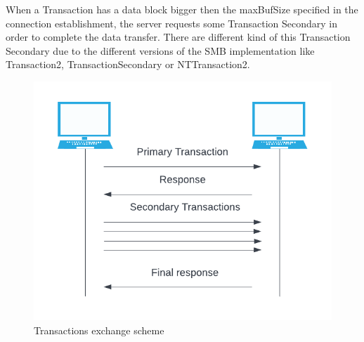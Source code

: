 When a Transaction has a data block bigger then the maxBufSize specified in the connection establishment, the server requests some Transaction Secondary in order
to complete the data transfer\cite{microsoft-transactions}.
There are different kind of this Transaction Secondary due to the different versions of the SMB implementation like Transaction2, TransactionSecondary or NTTransaction2.
\begin{figure}[ht!]
    \centering
      \includegraphics[]{images/transactions_scheme.png}
      \caption{Transactions exchange scheme}
\end{figure}